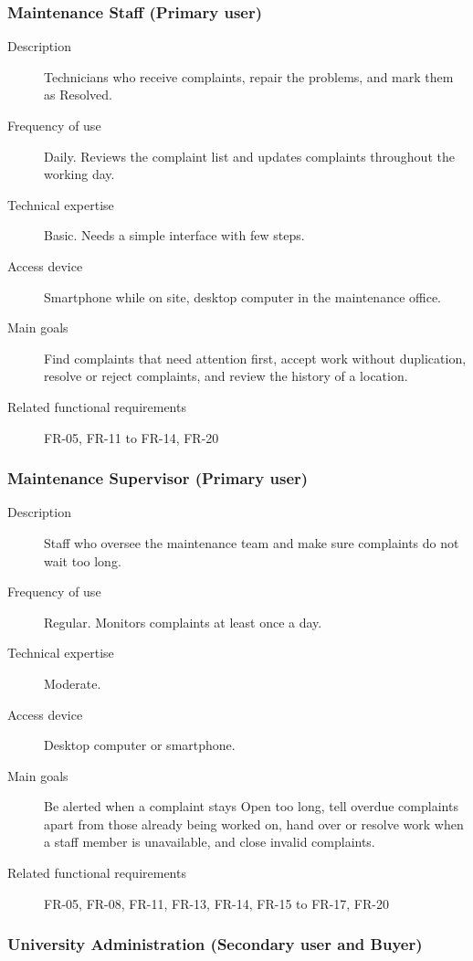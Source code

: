 \subsubsection*{Maintenance Staff (Primary user)}

\begin{description}
  \item[Description] Technicians who receive complaints, repair the problems, and mark them as Resolved.
  \item[Frequency of use] Daily. Reviews the complaint list and updates complaints throughout the working day.
  \item[Technical expertise] Basic. Needs a simple interface with few steps.
  \item[Access device] Smartphone while on site, desktop computer in the maintenance office.
  \item[Main goals] Find complaints that need attention first, accept work without duplication, resolve or reject complaints, and review the history of a location.
  \item[Related functional requirements] FR-05, FR-11 to FR-14, FR-20
\end{description}

\subsubsection*{Maintenance Supervisor (Primary user)}

\begin{description}
  \item[Description] Staff who oversee the maintenance team and make sure complaints do not wait too long.
  \item[Frequency of use] Regular. Monitors complaints at least once a day.
  \item[Technical expertise] Moderate.
  \item[Access device] Desktop computer or smartphone.
  \item[Main goals] Be alerted when a complaint stays Open too long, tell overdue complaints apart from those already being worked on, hand over or resolve work when a staff member is unavailable, and close invalid complaints.
  \item[Related functional requirements] FR-05, FR-08, FR-11, FR-13, FR-14, FR-15 to FR-17, FR-20
\end{description}

\subsubsection*{University Administration (Secondary user and Buyer)}

